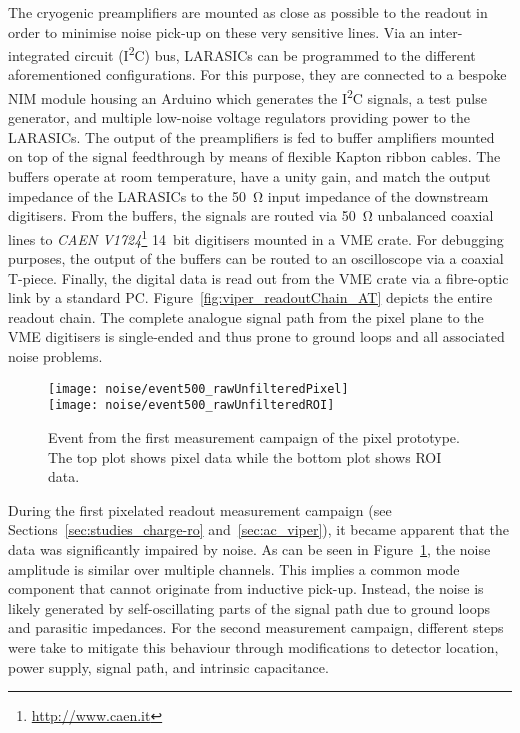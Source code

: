The cryogenic preamplifiers are mounted as close as possible to the readout in order to minimise noise pick-up on these very sensitive lines.
Via an inter-integrated circuit (I\textsuperscript{2}C) bus, LARASICs can be programmed to the different aforementioned configurations.
For this purpose, they are connected to a bespoke NIM module housing an Arduino which generates the I\textsuperscript{2}C signals, a test pulse generator, and multiple low-noise voltage regulators providing power to the LARASICs.
The output of the preamplifiers is fed to buffer amplifiers mounted on top of the signal feedthrough by means of flexible Kapton ribbon cables.
The buffers operate at room temperature, have a unity gain, and match the output impedance of the LARASICs to the \SI{50}{\ohm} input impedance of the downstream digitisers.
From the buffers, the signals are routed via \SI{50}{\ohm} unbalanced coaxial lines to \emph{CAEN V1724}\footnote{\url{http://www.caen.it}} \SI{14}{bit} digitisers mounted in a VME crate.
For debugging purposes, the output of the buffers can be routed to an oscilloscope via a coaxial T-piece.
Finally, the digital data is read out from the VME crate via a fibre-optic link by a standard PC.
Figure~\ref{fig:viper_readoutChain_AT} depicts the entire readout chain.
The complete analogue signal path from the pixel plane to the VME digitisers is single-ended and thus prone to ground loops and all associated noise problems.

\begin{figure}[htb]
	\centering
	\texttt{[image: noise/event500\_rawUnfilteredPixel]}\\
	\texttt{[image: noise/event500\_rawUnfilteredROI]}
	\caption{Event from the first measurement campaign of the pixel prototype.
	The top plot shows pixel data while the bottom plot shows ROI data.}
	\label{fig:electronics_event-run1}
\end{figure}

During the first pixelated readout measurement campaign (see Sections~\ref{sec:studies_charge-ro} and~\ref{sec:ac_viper}), it became apparent that the data was significantly impaired by noise.
As can be seen in Figure~\ref{fig:electronics_event-run1}, the noise amplitude is similar over multiple channels.
This implies a common mode component that cannot originate from inductive pick-up.
Instead, the noise is likely generated by self-oscillating parts of the signal path due to ground loops and parasitic impedances.
For the second measurement campaign, different steps were take to mitigate this behaviour through modifications to detector location, power supply, signal path, and intrinsic capacitance.

